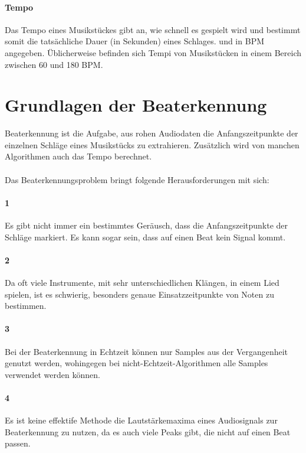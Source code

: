{	\paragraph{Tempo}
	{
		Das Tempo eines Musikstückes gibt an,
			wie schnell es gespielt wird
			und bestimmt somit die tatsächliche Dauer (in Sekunden) eines Schlages.
			und in \ac{BPM} angegeben.
		Üblicherweise befinden sich Tempi von Musikstücken in einem Bereich zwischen 60 und 180 \ac{BPM}.
	}
}

\section{Grundlagen der Beaterkennung}
{
	Beaterkennung ist die Aufgabe,
		aus rohen Audiodaten die Anfangszeitpunkte der einzelnen Schläge eines Musikstücks zu extrahieren.
	Zusätzlich wird von manchen Algorithmen auch das Tempo berechnet.

	\paragraph{}
	{
		Das Beaterkennungsproblem bringt folgende Herausforderungen mit sich:
	}

	\paragraph{1} %
	{
		Es gibt nicht immer ein bestimmtes Geräusch,
			dass die Anfangszeitpunkte der Schläge markiert.
		Es kann sogar sein, dass auf einen Beat kein Signal kommt.
	}

	\paragraph{2} %
	{
		Da oft viele Instrumente, mit sehr unterschiedlichen Klängen, in einem Lied spielen,
			ist es schwierig,
			besonders genaue Einsatzzeitpunkte von Noten zu bestimmen.
	}

	\paragraph{3} %
	{
		Bei der Beaterkennung in Echtzeit können nur Samples aus der Vergangenheit genutzt werden,
			wohingegen bei nicht-Echtzeit-Algorithmen alle Samples verwendet werden können.
	}

	\paragraph{4} %
	{
		Es ist keine effektife Methode die Lautstärkemaxima eines Audiosignals zur Beaterkennung zu nutzen,
			da es auch viele Peaks gibt,
			die nicht auf einen Beat passen.
	}

}
